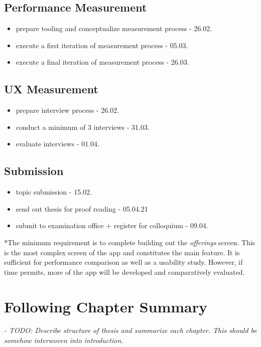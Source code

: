 \subsection{Performance Measurement}
\begin{itemize}
    \item prepare tooling and conceptualize measurement process - 26.02.
    \item execute a first iteration of measurement process - 05.03.
    \item execute a final iteration of measurement process - 26.03.
\end{itemize}

\subsection{UX Measurement}
\begin{itemize}
    \item prepare interview process - 26.02.
    \item conduct a minimum of 3 interviews - 31.03.
    \item evaluate interviews - 01.04.
\end{itemize}

\subsection{Submission}
\begin{itemize}
    \item topic submission - 15.02.
    \item send out thesis for proof reading - 05.04.21
    \item submit to examination office + register for colloquium - 09.04.
\end{itemize}

*The minimum requirement is to complete building out the \textit{offerings} screen. 
This is the most complex screen of the app and constitutes the main feature. 
It is sufficient for performance comparison as well as a usability study. 
However, if time permits, more of the app will be developed and comparatively evaluated. \\

\section{Following Chapter Summary}
\textit{- TODO: Describe structure of thesis and summarize each chapter. 
This should be somehow interwoven into introduction.}